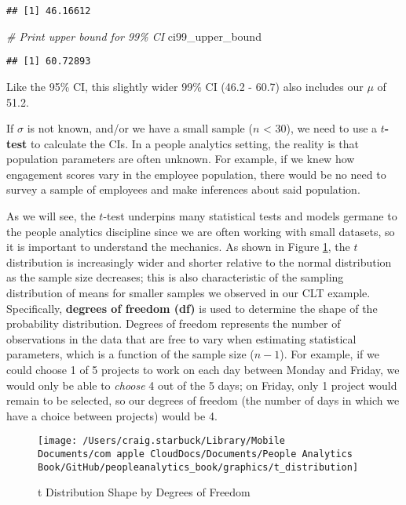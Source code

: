 \documentclass[
]{book}
\newenvironment{Shaded}{\begin{snugshade}}{\end{snugshade}}
\newcommand{\CommentTok}[1]{\textcolor[rgb]{0.56,0.35,0.01}{\textit{#1}}}
\newcommand{\NormalTok}[1]{#1}
\begin{document}
\begin{verbatim}
## [1] 46.16612
\end{verbatim}

\begin{Shaded}
\begin{Highlighting}[]
\CommentTok{\# Print upper bound for 99\% CI}
\NormalTok{ci99\_upper\_bound}
\end{Highlighting}
\end{Shaded}

\begin{verbatim}
## [1] 60.72893
\end{verbatim}

Like the 95\% CI, this slightly wider 99\% CI (46.2 - 60.7) also includes our \(\mu\) of 51.2.

If \(\sigma\) is not known, and/or we have a small sample (\(n\) \textless{} 30), we need to use a \(t\)\textbf{-test} to calculate the CIs. In a people analytics setting, the reality is that population parameters are often unknown. For example, if we knew how engagement scores vary in the employee population, there would be no need to survey a sample of employees and make inferences about said population.

As we will see, the \(t\)-test underpins many statistical tests and models germane to the people analytics discipline since we are often working with small datasets, so it is important to understand the mechanics. As shown in Figure \ref{fig:t-distribution}, the \(t\) distribution is increasingly wider and shorter relative to the normal distribution as the sample size decreases; this is also characteristic of the sampling distribution of means for smaller samples we observed in our CLT example. Specifically, \textbf{degrees of freedom (df)} is used to determine the shape of the probability distribution. Degrees of freedom represents the number of observations in the data that are free to vary when estimating statistical parameters, which is a function of the sample size (\(n - 1\)). For example, if we could choose 1 of 5 projects to work on each day between Monday and Friday, we would only be able to \emph{choose} 4 out of the 5 days; on Friday, only 1 project would remain to be selected, so our degrees of freedom (the number of days in which we have a choice between projects) would be 4.

\begin{figure}

{\centering \texttt{[image: /Users/craig.starbuck/Library/Mobile Documents/com~apple~CloudDocs/Documents/People Analytics Book/GitHub/peopleanalytics\_book/graphics/t\_distribution]} 

}

\caption{t Distribution Shape by Degrees of Freedom}\label{fig:t-distribution}
\end{figure}
\end{document}
